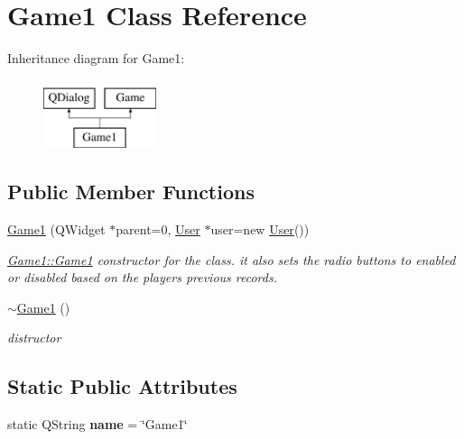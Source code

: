 \hypertarget{classGame1}{\section{Game1 Class Reference}
\label{classGame1}
}
Inheritance diagram for Game1\-:\begin{figure}[H]
\begin{center}
\leavevmode
\includegraphics[height=2.000000cm]{classGame1}
\end{center}
\end{figure}
\subsection*{Public Member Functions}
\begin{DoxyCompactItemize}
\item 
\hyperlink{classGame1_a151ee9fa2f4899fa571971b8d1fcd551}{Game1} (Q\-Widget $\ast$parent=0, \hyperlink{classUser}{User} $\ast$user=new \hyperlink{classUser}{User}())
\begin{DoxyCompactList}\small\item\em \hyperlink{classGame1_a151ee9fa2f4899fa571971b8d1fcd551}{Game1\-::\-Game1} constructor for the class. it also sets the radio buttons to enabled or disabled based on the players previous records. \end{DoxyCompactList}\item 
\hypertarget{classGame1_aa498b4499c4032cc7a65cc7755b1d3be}{\hyperlink{classGame1_aa498b4499c4032cc7a65cc7755b1d3be}{$\sim$\-Game1} ()}\label{classGame1_aa498b4499c4032cc7a65cc7755b1d3be}

\begin{DoxyCompactList}\small\item\em distructor \end{DoxyCompactList}\end{DoxyCompactItemize}
\subsection*{Static Public Attributes}
\begin{DoxyCompactItemize}
\item 
\hypertarget{classGame1_ad07b4333580894f280ac4c45e46bb83c}{static Q\-String {\bfseries name} = \char`\"{}Game1\char`\"{}}\label{classGame1_ad07b4333580894f280ac4c45e46bb83c}

\end{DoxyCompactItemize}
